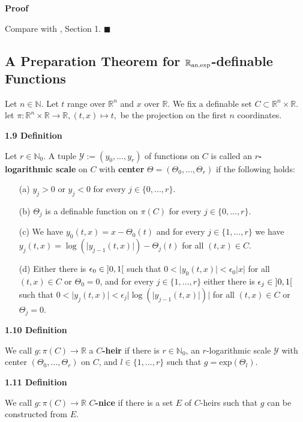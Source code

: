 \documentclass[12pt]{article}
\def\vs{\vspace}
\def\exp{\mathrm{exp}}
\begin{document}
\vs{0.3cm}
{\bf Proof}

\vs{0.1cm}
Compare with \cite{10}, Section 1. \hfill$\blacksquare$

\subsection{A Preparation Theorem for $\mathbb{R}_{\textnormal{an,exp}}$-definable \\
	Functions}

Let $n \in \mathbb{N}$. Let $t$ range over $\mathbb{R}^n$ and $x$ over $\mathbb{R}$. We fix a definable set $C \subset \mathbb{R}^n \times \mathbb{R}$. let $\pi: \mathbb{R}^n \times \mathbb{R} \to \mathbb{R}, (t,x) \mapsto t,$ be the projection on the first $n$ coordinates. 

\vs{0.5cm}
{\bf1.9 Definition}

\vs{0.1cm}
Let $r \in \mathbb{N}_0$. A tuple $\mathcal{Y}:=(y_0,...,y_r)$ of functions on $C$ is called an \textbf{$r$-logarithmic scale} on $C$ with \textbf{center} $\Theta=(\Theta_0,...,\Theta_r)$ if the following holds:
\begin{itemize}
	\item[(a)] $y_j>0$ or $y_j<0$ for every $j \in \{0,...,r\}$.
	\item[(b)] $\Theta_j$ is a definable function on $\pi(C)$ for every $j \in \{0,...,r\}$.
	\item[(c)] We have $y_0(t,x)=x-\Theta_0(t)$ and for every $j \in \{1,...,r\}$ we have $y_j(t,x)=\log(\vert{y_{j-1}(t,x)}\vert) - \Theta_j(t)$ for all $(t,x) \in C$.
	\item[(d)] Either there is $\epsilon_0 \in \textnormal{}]0,1[$ such that $0<\vert{y_0(t,x)}\vert < \epsilon_0\vert{x}\vert$ for all $(t,x) \in C$ or $\Theta_0=0$, and for every $j \in \{1,...,r\}$ either there is $\epsilon_j \in \textnormal{}]0,1[$ such that $0<\vert{y_j(t,x)}\vert<\epsilon_j\vert{\log(\vert{y_{j-1}(t,x)}\vert)}\vert$ for all $(t,x) \in C$ or $\Theta_j=0$.
\end{itemize}

\vs{0.5cm}
{\bf1.10 Definition}

\vs{0.1cm}
We call $g:\pi(C) \to \mathbb{R}$ a \textbf{$C$-heir} if there is $r \in \mathbb{N}_0$, an $r$-logarithmic scale $\mathcal{Y}$ with center $(\Theta_0,...,\Theta_r)$ on $C$, and $l \in \{1,...,r\}$ such that $g=\exp(\Theta_l)$.

\vs{0.5cm}
{\bf1.11 Definition}

\vs{0.1cm}
We call $g:\pi(C) \to \mathbb{R}$ \textbf{$C$-nice} if there is a set $E$ of $C$-heirs such that $g$ can be constructed from $E$.
\end{document}
